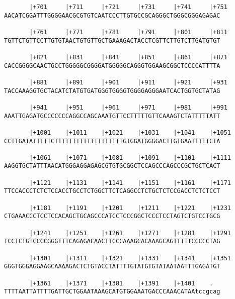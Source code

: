 \documentclass{article}
\begin{document}
\begin{Verbatim}
       |+701     |+711     |+721     |+731     |+741     |+751
AACATCGGATTTGGGGAACGCGTGTCAATCCCTTGTGCCGCAGGGCTGGGCGGGAGAGAC
                                                            
       |+761     |+771     |+781     |+791     |+801     |+811
TGTTCTGTTCCTTGTGTAACTGTGTTGCTGAAAGACTACCTCGTTCTTGTCTTGATGTGT
                                                            
       |+821     |+831     |+841     |+851     |+861     |+871
CACCGGGGCAACTGCCTGGGGGCGGGGATGGGGGCAGGGTGGAAGCGGCTCCCCATTTTA
                                                            
       |+881     |+891     |+901     |+911     |+921     |+931
TACCAAAGGTGCTACATCTATGTGATGGGTGGGGTGGGGAGGGAATCACTGGTGCTATAG
                                                            
       |+941     |+951     |+961     |+971     |+981     |+991
AAATTGAGATGCCCCCCCAGGCCAGCAAATGTTCCTTTTTGTTCAAAGTCTATTTTTATT
                                                            
       |+1001    |+1011    |+1021    |+1031    |+1041    |+1051
CCTTGATATTTTTCTTTTTTTTTTTTTTTTTTTGTGGATGGGGACTTGTGAATTTTTCTA
                                                            
       |+1061    |+1071    |+1081    |+1091    |+1101    |+1111
AAGGTGCTATTTAACATGGGAGGAGAGCGTGTGCGGCTCCAGCCCAGCCCGCTGCTCACT
                                                            
       |+1121    |+1131    |+1141    |+1151    |+1161    |+1171
TTCCACCCTCTCTCCACCTGCCTCTGGCTTCTCAGGCCTCTGCTCTCCGACCTCTCTCCT
                                                            
       |+1181    |+1191    |+1201    |+1211    |+1221    |+1231
CTGAAACCCTCCTCCACAGCTGCAGCCCATCCTCCCGGCTCCCTCCTAGTCTGTCCTGCG
                                                            
       |+1241    |+1251    |+1261    |+1271    |+1281    |+1291
TCCTCTGTCCCCGGGTTTCAGAGACAACTTCCCAAAGCACAAAGCAGTTTTTCCCCCTAG
                                                            
       |+1301    |+1311    |+1321    |+1331    |+1341    |+1351
GGGTGGGAGGAAGCAAAAGACTCTGTACCTATTTTGTATGTGTATAATAATTTGAGATGT
                                                            
       |+1361    |+1371    |+1381    |+1391    |+1401    .  
TTTTAATTATTTTGATTGCTGGAATAAAGCATGTGGAAATGACCCAAACATAAtccgcag
                                                            

\end{Verbatim}
\end{document}
